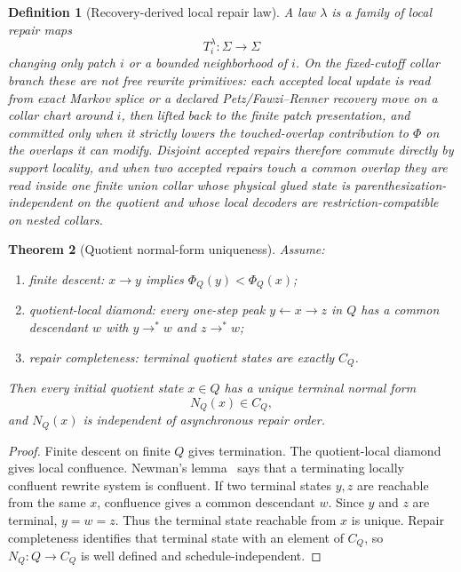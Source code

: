 \documentclass[11pt]{article}
\newtheorem{theorem}{Theorem}[section]
\newtheorem{definition}[theorem]{Definition}
\begin{document}
\begin{definition}[Recovery-derived local repair law]
A law $\lambda$ is a family of local repair maps
\[
T_i^\lambda:\Sigma\to\Sigma
\]
changing only patch $i$ or a bounded neighborhood of $i$. On the fixed-cutoff collar branch these
are not free rewrite primitives: each accepted local update is read from exact Markov splice or a
declared Petz/Fawzi--Renner recovery move on a collar chart around \(i\), then lifted back to the
finite patch presentation, and committed only when it strictly lowers the touched-overlap
contribution to \(\Phi\) on the overlaps it can modify. Disjoint accepted repairs therefore
commute directly by support locality, and when two accepted repairs touch a common overlap they are read inside one
finite union collar whose physical glued state is parenthesization-independent on the quotient and
whose local decoders are restriction-compatible on nested collars.
\end{definition}

\begin{theorem}[Quotient normal-form uniqueness]\label{thm:confluence}
Assume:
\begin{enumerate}[label=\textup{(\roman*)},leftmargin=2em]
\item finite descent: \(x\to y\) implies \(\Phi_Q(y)<\Phi_Q(x)\);
\item quotient-local diamond: every one-step peak \(y\leftarrow x\to z\) in \(Q\) has a common
descendant \(w\) with \(y\to^*w\) and \(z\to^*w\);
\item repair completeness: terminal quotient states are exactly \(C_Q\).
\end{enumerate}
Then every initial quotient state \(x\in Q\) has a unique terminal normal form
\[
N_Q(x)\in C_Q,
\]
and \(N_Q(x)\) is independent of asynchronous repair order.
\end{theorem}

\begin{proof}
Finite descent on finite \(Q\) gives termination. The quotient-local diamond gives local
confluence. Newman's lemma~\cite{newman42} says that a terminating locally confluent rewrite
system is confluent. If two terminal states \(y,z\) are reachable from the same \(x\), confluence
gives a common descendant \(w\). Since \(y\) and \(z\) are terminal, \(y=w=z\). Thus the terminal
state reachable from \(x\) is unique. Repair completeness identifies that terminal state with an
element of \(C_Q\), so \(N_Q:Q\to C_Q\) is well defined and schedule-independent.
\end{proof}
\end{document}
